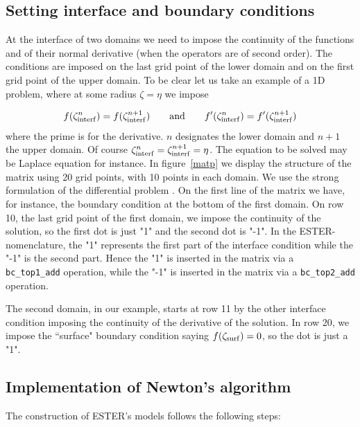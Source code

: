 \subsection{Setting interface and boundary conditions}

At the interface of two domains we need to impose the continuity of the
functions and of their normal derivative (when the operators are of
second order). The conditions are imposed on the last grid point of the
lower domain and on the first grid point of the upper domain. To be
clear let us take an example of a 1D problem, where at some radius
$\zeta=\eta$ we impose

\[ f(\zeta_{\rm interf}^n) = f(\zeta_{\rm interf}^{n+1}) \qquad {\rm and}\qquad f'(\zeta_{\rm
interf}^n) = f'(\zeta_{\rm interf}^{n+1})\]
where the prime is for the derivative. $n$ designates the lower domain
and $n+1$ the upper domain. Of course $\zeta_{\rm interf}^n=\zeta_{\rm
interf}^{n+1}=\eta$. The equation to be solved may be Laplace
equation for instance. In figure~\ref{matp} we display the structure of the
matrix using 20 grid points, with 10 points in each domain. We use the
strong formulation of the differential problem \cite[][]{RELP16}. On the
first line of the matrix we have, for instance, the boundary condition
at the bottom of the first domain. On row 10, the last grid point of the
first domain, we impose the continuity of the solution, so the first dot
is just "1" and the second dot is "-1". In the ESTER-nomenclature, the
"1" represents the first part of the interface condition while the "-1"
is the second part. Hence the "1" is inserted in the matrix via a {\tt
bc\_top1\_add} operation, while the "-1" is inserted in the matrix via a
{\tt bc\_top2\_add}  operation.

The second domain, in our example, starts at row 11 by the other
interface condition imposing the continuity of the derivative of the
solution. In row 20, we impose the ``surface" boundary condition saying
$f(\zeta_{\rm surf})=0$, so the dot is just a "1".


\subsection{Implementation of Newton's algorithm}

The construction of ESTER's models follows the following steps:


